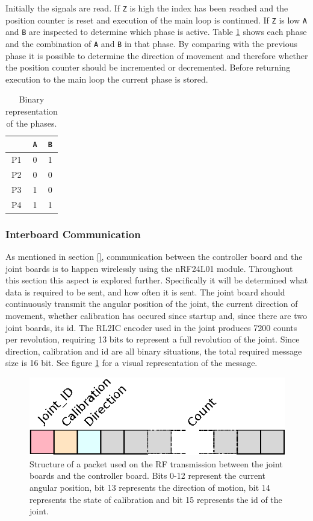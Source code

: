 {Initially the signals are read.
If \texttt{Z} is high the index has been reached and the position counter is reset and execution of the main loop is continued.
If \texttt{Z} is low \texttt{A} and \texttt{B} are inspected to determine which phase is active.
Table \ref{tab:bin_phase} shows each phase and the combination of \texttt{A} and \texttt{B} in that phase.
By comparing with the previous phase it is possible to determine the direction of movement and therefore whether the position counter should be incremented or decremented.
Before returning execution to the main loop the current phase is stored. 

\begin{table}
	\centering
	\begin{tabular}{c | c  c}
		& \texttt{A} & \texttt{B}\\
		\hline
		P1 & 0 & 1\\
		P2 & 0 & 0\\
		P3 & 1 & 0\\
		P4 & 1 & 1
	\end{tabular}
	\caption{Binary representation of the phases.}
	\label{tab:bin_phase}
\end{table}

\subsubsection{Interboard Communication} %
\label{ssub:interboard_communication}
As mentioned in section \ref{}, communication between the controller board and the joint boards is to happen wirelessly using the nRF24L01 module.
Throughout this section this aspect is explored further.
Specifically it will be determined what data is required to be sent, and how often it is sent.
The joint board should continuously transmit the angular position of the joint, the current direction of movement, whether calibration has occured since startup and, since there are two joint boards, its id.
The RL2IC encoder used in the joint produces 7200 counts per revolution, requiring 13 bits to represent a full revolution of the joint.
Since direction, calibration and id are all binary situations, the total required message size is 16 bit.
See figure \ref{fig:rfpacket} for a visual representation of the message.
\begin{figure}[h]
	\centering
	\includegraphics[width=.5\linewidth]{graphics/rf_packet}
	\caption[Structure of a packet used on the RF transmission between the joint boards and the controller board.]{Structure of a packet used on the RF transmission between the joint boards and the controller board. Bits 0-12 represent the current angular position, bit 13 represents the direction of motion, bit 14 represents the state of calibration and bit 15 represents the id of the joint.}
	\label{fig:rfpacket}
\end{figure}

}
